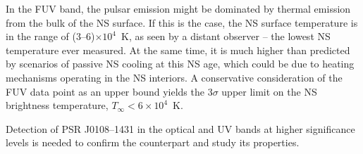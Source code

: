 \documentclass[pdftex,twocolumn]{aastex62}
\newcommand{\yus}[1]{{\color[rgb]{0.5,0.1,0.5}YS: #1}}
\newcommand{\gp}[1]{{\color{blue} #1}}
\begin{document}
In the FUV band, the pulsar emission 
might be dominated by thermal emission 
from the bulk of the NS surface.
If this is the case,
the NS surface temperature is
in the range of (3--6)$\times 10^4$~K,
as seen by a distant observer 
-- the lowest NS temperature ever measured.
At the same time, it is much higher 
than predicted by scenarios of passive NS cooling at this NS age,
which could be due to heating mechanisms operating in the NS interiors. A conservative consideration of the FUV data point as  an  upper bound yields the 3$\sigma$   upper limit on the NS  brightness temperature,   $T_\infty < 6\times 10^4$~K. 


Detection of 
PSR J0108--1431 in the optical and 
UV bands at higher significance levels is needed to confirm the counterpart and study its properties.



%


\end{document}
